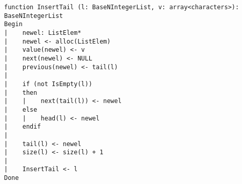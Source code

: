 \begin{lstlisting}[breaklines]
function InsertTail (l: BaseNIntegerList, v: array<characters>): BaseNIntegerList
Begin
|    newel: ListElem*
|    newel <- alloc(ListElem)
|    value(newel) <- v
|    next(newel) <- NULL
|    previous(newel) <- tail(l)
|
|    if (not IsEmpty(l))
|    then
|    |    next(tail(l)) <- newel
|    else
|    |    head(l) <- newel
|    endif
|
|    tail(l) <- newel
|    size(l) <- size(l) + 1
|
|    InsertTail <- l
Done
\end{lstlisting}
